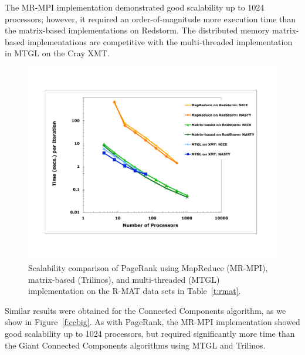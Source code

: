 The MR-MPI implementation demonstrated good scalability up to 1024 processors; 
however, it required an order-of-magnitude
more execution time than the matrix-based implementations on Redstorm.  
The distributed memory matrix-based
implementations are competitive with the multi-threaded implementation
in MTGL on the Cray XMT.

\begin{figure}[htb]
\includegraphics[width=\textwidth]{fig_pagerank_big.pdf}
\caption{Scalability comparison of PageRank using MapReduce (MR-MPI),
matrix-based (Trilinos), and multi-threaded (MTGL) implementation
on the R-MAT data sets in Table~\ref{t:rmat}.}
\label{f:prbig}
\end{figure}

Similar results were obtained for the Connected Components algorithm, as
we show in Figure~\ref{f:ccbig}.  As with PageRank, the MR-MPI implementation
showed good scalability up to 1024 processors, but required significantly
more time than the Giant Connected Components algorithms using MTGL and
Trilinos.

